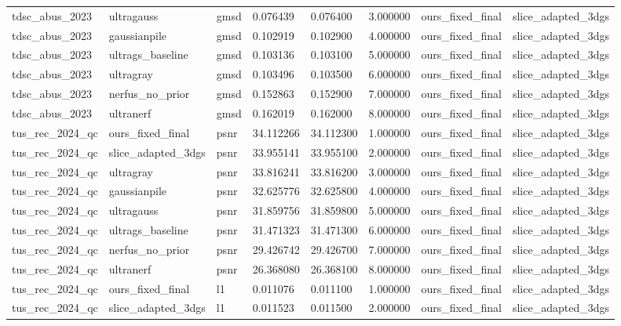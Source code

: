 \begin{tabular}{llllllll}
tdsc\_abus\_2023 & ultragauss & gmsd & 0.076439 & 0.076400 & 3.000000 & ours\_fixed\_final & slice\_adapted\_3dgs \\
tdsc\_abus\_2023 & gaussianpile & gmsd & 0.102919 & 0.102900 & 4.000000 & ours\_fixed\_final & slice\_adapted\_3dgs \\
tdsc\_abus\_2023 & ultrags\_baseline & gmsd & 0.103136 & 0.103100 & 5.000000 & ours\_fixed\_final & slice\_adapted\_3dgs \\
tdsc\_abus\_2023 & ultragray & gmsd & 0.103496 & 0.103500 & 6.000000 & ours\_fixed\_final & slice\_adapted\_3dgs \\
tdsc\_abus\_2023 & nerfus\_no\_prior & gmsd & 0.152863 & 0.152900 & 7.000000 & ours\_fixed\_final & slice\_adapted\_3dgs \\
tdsc\_abus\_2023 & ultranerf & gmsd & 0.162019 & 0.162000 & 8.000000 & ours\_fixed\_final & slice\_adapted\_3dgs \\
tus\_rec\_2024\_qc & ours\_fixed\_final & psnr & 34.112266 & 34.112300 & 1.000000 & ours\_fixed\_final & slice\_adapted\_3dgs \\
tus\_rec\_2024\_qc & slice\_adapted\_3dgs & psnr & 33.955141 & 33.955100 & 2.000000 & ours\_fixed\_final & slice\_adapted\_3dgs \\
tus\_rec\_2024\_qc & ultragray & psnr & 33.816241 & 33.816200 & 3.000000 & ours\_fixed\_final & slice\_adapted\_3dgs \\
tus\_rec\_2024\_qc & gaussianpile & psnr & 32.625776 & 32.625800 & 4.000000 & ours\_fixed\_final & slice\_adapted\_3dgs \\
tus\_rec\_2024\_qc & ultragauss & psnr & 31.859756 & 31.859800 & 5.000000 & ours\_fixed\_final & slice\_adapted\_3dgs \\
tus\_rec\_2024\_qc & ultrags\_baseline & psnr & 31.471323 & 31.471300 & 6.000000 & ours\_fixed\_final & slice\_adapted\_3dgs \\
tus\_rec\_2024\_qc & nerfus\_no\_prior & psnr & 29.426742 & 29.426700 & 7.000000 & ours\_fixed\_final & slice\_adapted\_3dgs \\
tus\_rec\_2024\_qc & ultranerf & psnr & 26.368080 & 26.368100 & 8.000000 & ours\_fixed\_final & slice\_adapted\_3dgs \\
tus\_rec\_2024\_qc & ours\_fixed\_final & l1 & 0.011076 & 0.011100 & 1.000000 & ours\_fixed\_final & slice\_adapted\_3dgs \\
tus\_rec\_2024\_qc & slice\_adapted\_3dgs & l1 & 0.011523 & 0.011500 & 2.000000 & ours\_fixed\_final & slice\_adapted\_3dgs \\

\end{tabular}
